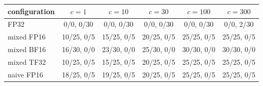 \begin{tabular}{l|ccccc}
\toprule
configuration & $c=1$ & $c=10$ & $c=30$ & $c=100$ & $c=300$\\
\midrule
FP32 & \cellcolor{green!15}0/0, 0/30 & \cellcolor{green!15}0/0, 0/30 & \cellcolor{green!15}0/0, 0/30 & \cellcolor{green!15}0/0, 0/30 & \cellcolor{red!25}0/0, 2/30\\
mixed FP16 & \cellcolor{orange!30}10/25, 0/5 & \cellcolor{orange!30}15/25, 0/5 & \cellcolor{orange!30}20/25, 0/5 & \cellcolor{green!15}25/25, 0/5 & \cellcolor{green!15}25/25, 0/5\\
mixed BF16 & \cellcolor{orange!30}16/30, 0/0 & \cellcolor{orange!30}23/30, 0/0 & \cellcolor{orange!30}25/30, 0/0 & \cellcolor{green!15}30/30, 0/0 & \cellcolor{green!15}30/30, 0/0\\
mixed TF32 & \cellcolor{orange!30}10/25, 0/5 & \cellcolor{orange!30}15/25, 0/5 & \cellcolor{orange!30}20/25, 0/5 & \cellcolor{green!15}25/25, 0/5 & \cellcolor{green!15}25/25, 0/5\\
naive FP16 & \cellcolor{orange!30}18/25, 0/5 & \cellcolor{orange!30}19/25, 0/5 & \cellcolor{orange!30}20/25, 0/5 & \cellcolor{green!15}25/25, 0/5 & \cellcolor{green!15}25/25, 0/5\\
\bottomrule
\end{tabular}
